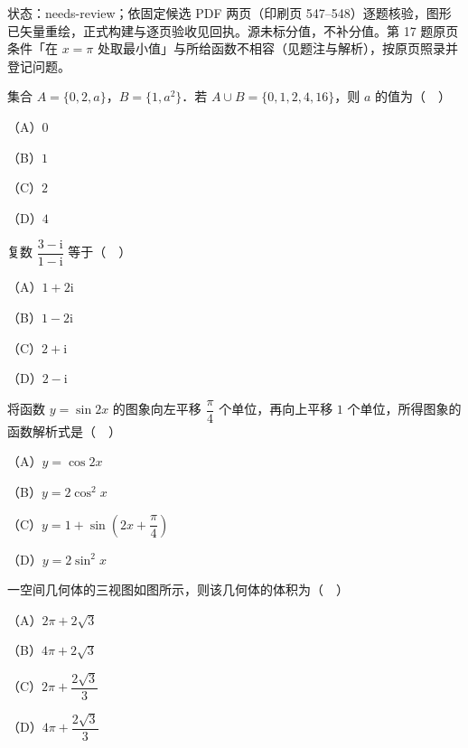 

状态：needs-review；依固定候选 PDF 两页（印刷页 547–548）逐题核验，图形已矢量重绘，正式构建与逐页验收见回执。源未标分值，不补分值。第 17 题原页条件「在 $x=\pi$ 处取最小值」与所给函数不相容（见题注与解析），按原页照录并登记问题。


\begin{question}
集合 $A=\{0,2,a\}$，$B=\{1,a^2\}$．若 $A\cup B=\{0,1,2,4,16\}$，则 $a$ 的值为（　）

（A）$0$

（B）$1$

（C）$2$

（D）$4$

\end{question}
\begin{question}
复数 $\dfrac{3-\mathrm i}{1-\mathrm i}$ 等于（　）

（A）$1+2\mathrm i$

（B）$1-2\mathrm i$

（C）$2+\mathrm i$

（D）$2-\mathrm i$

\end{question}
\begin{question}
将函数 $y=\sin2x$ 的图象向左平移 $\dfrac{\pi}{4}$ 个单位，再向上平移 $1$ 个单位，所得图象的函数解析式是（　）

（A）$y=\cos2x$

（B）$y=2\cos^2x$

（C）$y=1+\sin\left(2x+\dfrac{\pi}{4}\right)$

（D）$y=2\sin^2x$

\Needspace{0.4\textheight}
\end{question}
\begin{question}
一空间几何体的三视图如图所示，则该几何体的体积为（　）

（A）$2\pi+2\sqrt3$

（B）$4\pi+2\sqrt3$

（C）$2\pi+\dfrac{2\sqrt3}{3}$

（D）$4\pi+\dfrac{2\sqrt3}{3}$
\nopagebreak[4]
\begin{center}\end{center}
\nopagebreak[4]
\end{question}
